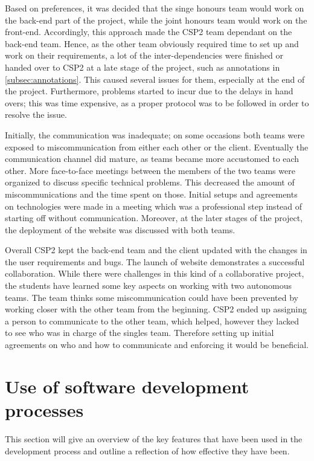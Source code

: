 \documentclass{l3proj}
\begin{document}
Based on preferences, it was decided that the singe honours team would work on the back-end part of the project, while the joint honours team would work on the front-end. Accordingly, this approach made the CSP2 team dependant on the back-end team. Hence, as the other team obviously required time to set up and work on their requirements, a lot of the inter-dependencies were finished or handed over to CSP2 at a late stage of the project, such as annotations in \ref{subsec:annotations}. This caused several issues for them, especially at the end of the project. Furthermore, problems started to incur due to the delays in hand overs; this was time expensive, as a proper protocol was to be followed in order to resolve the issue. 

Initially, the communication was inadequate; on some occasions both teams were exposed to miscommunication from either each other or the client. Eventually the communication channel did mature, as teams became more accustomed to each other. More face-to-face meetings between the members of the two teams were organized to discuss specific technical problems. This decreased the amount of miscommunications and the time spent on those.  Initial setups and agreements on technologies were made in a meeting which was a professional step instead of starting off without communication. Moreover, at the later stages of the project, the deployment of the website was discussed with both teams. 

Overall CSP2 kept the back-end team and the client updated with the changes in the user requirements and bugs. The launch of website demonstrates a successful collaboration. While there were challenges in this kind of a collaborative project, the students have learned some key aspects on working with two autonomous teams. The team thinks some miscommunication could have been prevented by working closer with the other team from the beginning. CSP2 ended up assigning a person to communicate to the other team, which helped, however they lacked to see who was in charge of the singles team. Therefore setting up initial agreements on who and how to communicate and enforcing it would be beneficial.




\section{Use of software development processes}
This section will give an overview of the key features that have been used in the development process and outline a reflection of how effective they have been.
\end{document}
